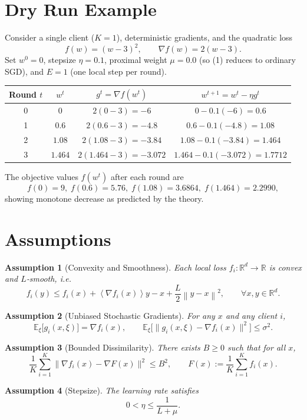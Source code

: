 \documentclass{article}
\newtheorem{assumption}{Assumption}
\newcommand{\E}{\mathbb{E}}
\newcommand{\norm}[1]{\left\lVert#1\right\rVert}
\newcommand{\inner}[1]{\left\langle#1\right\rangle}
\begin{document}
\section*{Dry Run Example}
Consider a single client ($K=1$), deterministic gradients, and the quadratic loss
\[
f(w)=(w-3)^{2},\qquad \nabla f(w)=2(w-3).
\]
Set $w^{0}=0$, stepsize $\eta=0.1$, proximal weight $\mu=0.0$ (so (1) reduces to ordinary SGD), and $E=1$ (one local step per round).  

\begin{tabular}{c|c|c|c}
\textbf{Round $t$} & $w^{t}$ & $g^{t}= \nabla f(w^{t})$ & $w^{t+1}=w^{t}-\eta g^{t}$\\ \hline
0 & $0$ & $2(0-3)=-6$ & $0-0.1(-6)=0.6$\\
1 & $0.6$ & $2(0.6-3)=-4.8$ & $0.6-0.1(-4.8)=1.08$\\
2 & $1.08$ & $2(1.08-3)=-3.84$ & $1.08-0.1(-3.84)=1.464$\\
3 & $1.464$ & $2(1.464-3)=-3.072$ & $1.464-0.1(-3.072)=1.7712$
\end{tabular}

The objective values $f(w^{t})$ after each round are
\[
f(0)=9,\; f(0.6)=5.76,\; f(1.08)=3.6864,\; f(1.464)=2.2990,
\]
showing monotone decrease as predicted by the theory.

\newpage
\section*{Assumptions}
\begin{assumption}[Convexity and Smoothness]\label{ass:convex}
Each local loss $f_i:\mathbb{R}^{d}\to\mathbb{R}$ is convex and $L$‑smooth, i.e.
\[
f_i(y)\le f_i(x)+\inner{\nabla f_i(x)}{y-x}+\frac{L}{2}\norm{y-x}^{2},
\qquad\forall x,y\in\mathbb{R}^{d}.
\]
\end{assumption}
\begin{assumption}[Unbiased Stochastic Gradients]\label{ass:unbiased}
For any $x$ and any client $i$,
\[
\E_{\xi}\!\bigl[g_i(x,\xi)\bigr]=\nabla f_i(x),\qquad 
\E_{\xi}\!\bigl[\|g_i(x,\xi)-\nabla f_i(x)\|^{2}\bigr]\le\sigma^{2}.
\]
\end{assumption}
\begin{assumption}[Bounded Dissimilarity]\label{ass:dissim}
There exists $B\ge0$ such that for all $x$,
\[
\frac{1}{K}\sum_{i=1}^{K}\|\nabla f_i(x)-\nabla F(x)\|^{2}\le B^{2},
\qquad 
F(x):=\frac{1}{K}\sum_{i=1}^{K}f_i(x).
\]
\end{assumption}
\begin{assumption}[Stepsize]\label{ass:stepsize}
The learning rate satisfies
\[
0<\eta\le\frac{1}{L+\mu}.
\]
\end{assumption}
\end{document}
